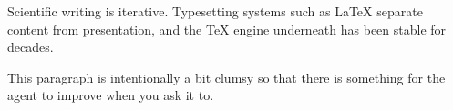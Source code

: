 Scientific writing is iterative. Typesetting systems such as \LaTeX{}
\citep{lamport1994latex} separate content from presentation, and the \TeX{}
engine underneath \citep{knuth1984texbook} has been stable for decades.

This paragraph is intentionally a bit clumsy so that there is something for
the agent to improve when you ask it to.
